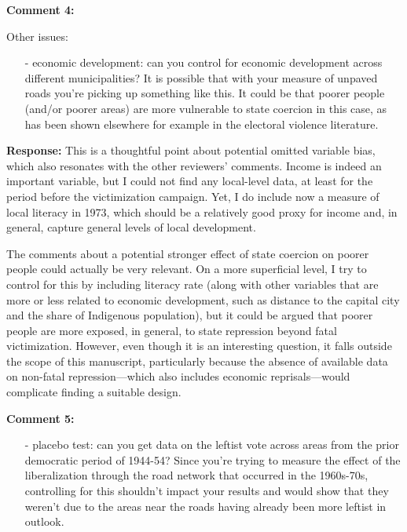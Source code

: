 \documentclass[12pt, a4paper, notitlepage]{article}
\begin{document}
\vspace{15pt}
\noindent\textbf{Comment 4:}
\begin{displayquote}
Other issues:

\begin{itemize}
\item[-] economic development: can you control for economic development across different municipalities? It is possible that with your measure of unpaved roads you’re picking up something like this. It could be that poorer people (and/or poorer areas) are more vulnerable to state coercion in this case, as has been shown elsewhere for example in the electoral violence literature.
\end{itemize}
\end{displayquote}

\noindent\textbf{Response:} This is a thoughtful point about potential omitted variable bias, which also resonates with the other reviewers' comments. Income is indeed an important variable, but I could not find any local-level data, at least for the period before the victimization campaign. Yet, I do include now a measure of local literacy in 1973, which should be a relatively good proxy for income and, in general, capture general levels of local development.

The comments about a potential stronger effect of state coercion on poorer people could actually be very relevant. On a more superficial level, I try to control for this by including literacy rate (along with other variables that are more or less related to economic development, such as distance to the capital city and the share of Indigenous population), but it could be argued that poorer people are more exposed, in general, to state repression beyond fatal victimization. However, even though it is an interesting question, it falls outside the scope of this manuscript, particularly because the absence of available data on non-fatal repression---which also includes economic reprisals---would complicate finding a suitable design.

\vspace{15pt}
\noindent\textbf{Comment 5:}
\begin{displayquote}
\begin{itemize}
\item[-] placebo test: can you get data on the leftist vote across areas from the prior democratic period of 1944-54? Since you’re trying to measure the effect of the liberalization through the road network that occurred in the 1960s-70s, controlling for this shouldn’t impact your results and would show that they weren’t due to the areas near the roads having already been more leftist in outlook.
\end{itemize}
\end{displayquote}
\end{document}
